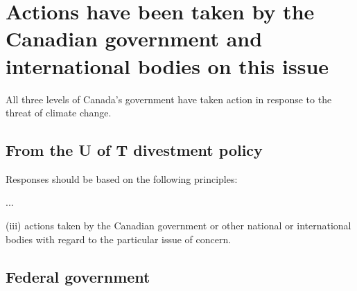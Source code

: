 

	
	
		\section{Actions have been taken by the Canadian government and international bodies on this issue}



All three levels of Canada's government have taken action in response to the threat of climate change.

		\subsection{From the U of T divestment policy}


\begin{itquote}	
Responses should be based on the following principles:

...

(iii) actions taken by the Canadian government or other national or international bodies with regard to the particular issue of concern.
\end{itquote}


		
		\subsection{Federal government}
		
		
		
